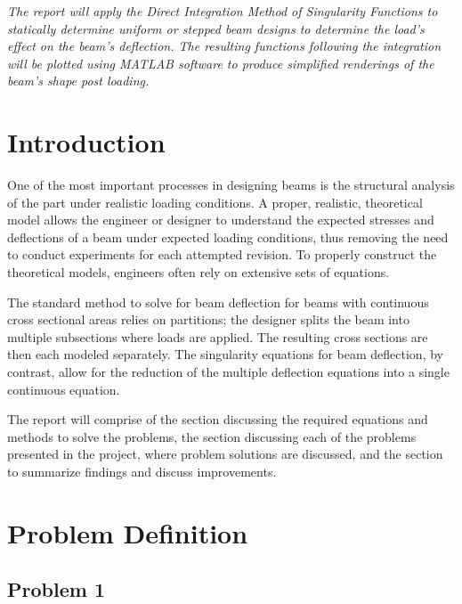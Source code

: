 \documentclass[a4paper]{article}
\begin{document}



\large
\textit{The report will apply the Direct Integration Method of Singularity Functions to statically determine uniform or stepped beam designs to determine the load's effect on the beam's deflection. The resulting functions following the integration will be plotted using MATLAB software to produce simplified renderings of the beam's shape post loading.}

\tableofcontents

\section{Introduction} \label{Introduction}
One of the most important processes in designing beams is the structural analysis of the part under realistic loading conditions. A proper, realistic, theoretical model allows the engineer or designer to understand the expected stresses and deflections of a beam under expected loading conditions, thus removing the need to conduct experiments for each attempted revision. To properly construct the theoretical models, engineers often rely on extensive sets of equations.

The standard method to solve for beam deflection for beams with continuous cross sectional areas relies on partitions; the designer splits the beam into multiple subsections where loads are applied. The resulting cross sections are then each modeled separately. The singularity equations for beam deflection, by contrast, allow for the reduction of the multiple deflection equations into a single continuous equation.

The report will comprise of the  section discussing the required equations and methods to solve the problems, the  section discussing each of the problems presented in the project,  where problem solutions are discussed, and the  section to summarize findings and discuss improvements.


\section{Problem Definition} \label{Problems}
\subsection{Problem 1}
\end{document}

